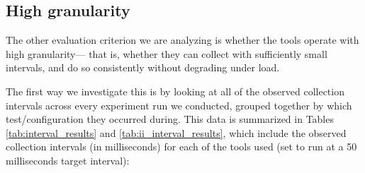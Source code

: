 \documentclass[a4paper,11pt]{article}
\begin{document}
\subsection{High granularity}

The other evaluation criterion we are analyzing is whether the tools operate with high granularity---%
that is, whether they can collect with sufficiently small intervals,
and do so consistently without degrading under load.

The first way we investigate this is by looking at all of the observed collection intervals
across every experiment run we conducted,
grouped together by which test/configuration they occurred during.
This data is summarized in Tables \ref{tab:interval_results} and \ref{tab:ii_interval_results},
which include the observed collection intervals (in milliseconds)
for each of the tools used (set to run at a 50 milliseconds target interval):
\end{document}
